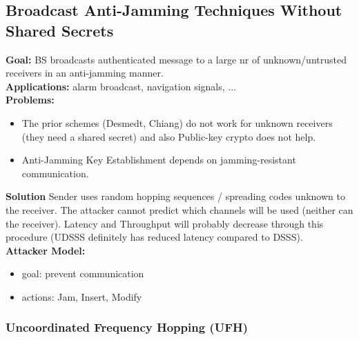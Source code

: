 \subsection{Broadcast Anti-Jamming Techniques Without Shared Secrets}

\textbf{Goal:} BS broadcasts authenticated message to a large nr of unknown/untrusted receivers in an anti-jamming manner.\\
\textbf{Applications:} alarm broadcast, navigation signals, ...\\
\textbf{Problems:} 
    \begin{itemize}
        \item The prior schemes (Desmedt, Chiang) do not work for unknown receivers (they need a shared secret) and also Public-key crypto does not help.
        \item Anti-Jamming Key Establishment depends on jamming-resistant communication.
    \end{itemize}
\textbf{Solution} Sender uses random hopping sequences / spreading codes unknown to the receiver. The attacker cannot predict which channels will be used (neither can the receiver). Latency and Throughput will probably decrease through this procedure (UDSSS definitely has reduced latency compared to DSSS).\\
\textbf{Attacker Model:} 
\begin{itemize}
    \item goal: prevent communication
    \item actions: Jam, Insert, Modify
\end{itemize}

\subsubsection{Uncoordinated Frequency Hopping (UFH)}

